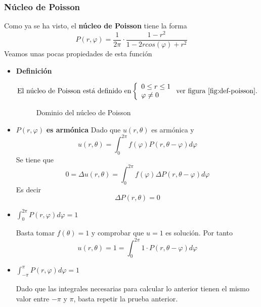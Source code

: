 \subsubsection{Núcleo de Poisson}
Como ya se ha visto, el \textbf{núcleo de Poisson} tiene la forma $$P(r,\varphi) = \frac{1}{2\pi}\cdot\frac{1-r^2}{1-2rcos(\varphi)+r^2}$$
Veamos unas pocas propiedades de esta función
\begin{itemize}
\item \textbf{Definición}

\begin{equation*}
\text{El núcleo de Poisson está definido en}
\left\{
\begin{array}{l}
0\le r\le 1\\
\varphi \neq 0
\end{array}
\right.
\text{ver figura \ref{fig:def-poisson}.}
\end{equation*}

\begin{figure}[ht]
\centering
{}
\caption{Dominio del núcleo de Poisson}
\label{fig:def-poisson}
\end{figure}

\item $P(r, \varphi)$ \textbf{es armónica}
Dado que $u(r,\theta)$ es armónica y 
$$u(r,\theta)=\int_0^{2\pi}f(\varphi)P(r,\theta-\varphi)d\varphi$$
Se tiene que 
$$0 = \Delta u(r,\theta)=\int_0^{2\pi}f(\varphi)\Delta P(r,\theta-\varphi)d\varphi$$
Es decir
$$\Delta P(r,\theta) = 0$$

\item $\int_0^{2\pi}P(r,\varphi)d\varphi = 1$

Basta tomar $f(\theta) = 1$ y comprobar que $u=1$ es solución. Por tanto
$$u(r, \theta) = 1 = \int_0^{2\pi}1\cdot P(r,\theta-\varphi)d\varphi$$

\item $\int_{-\pi}^{\pi}P(r,\varphi)d\varphi = 1$

Dado que las integrales necesarias para calcular lo anterior tienen el mismo valor entre $-\pi$ y $\pi$, basta repetir la prueba anterior.
\end{itemize}


